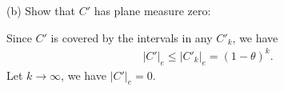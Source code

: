 \documentclass[UTF8,a4paper,10pt]{article}
\begin{document}
\begin{solution}
  \dotfill

  (b) Show that \(C'\) has plane measure
  zero:

  Since \(C'\) is covered by the intervals in any \(C'_k\), we have
  \begin{equation*}
    \begin{aligned}
      \left\lvert C'\right\rvert_e \leq \left\lvert C'_k \right\rvert_e = \left(1-\theta\right)^{k}.
    \end{aligned}
  \end{equation*}
  Let \(k\to\infty\), we have \(\left\lvert C'\right\rvert_e = 0\).

\end{solution}
\end{document}
